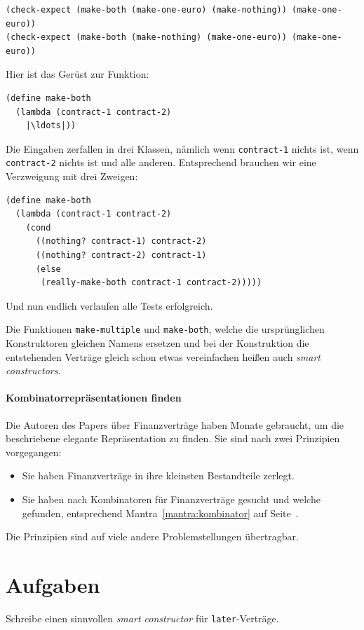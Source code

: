 %
\begin{lstlisting}
(check-expect (make-both (make-one-euro) (make-nothing)) (make-one-euro))
(check-expect (make-both (make-nothing) (make-one-euro)) (make-one-euro))
\end{lstlisting}
%
Hier ist das Gerüst zur Funktion:
%
\begin{lstlisting}
(define make-both
  (lambda (contract-1 contract-2)
    |\ldots|))
\end{lstlisting}
%
Die Eingaben zerfallen in drei Klassen, nämlich wenn
\lstinline{contract-1} nichts ist, wenn \lstinline{contract-2} nichts
ist und alle anderen.  Entsprechend brauchen wir eine Verzweigung mit
drei Zweigen:
%
\begin{lstlisting}
(define make-both
  (lambda (contract-1 contract-2)
    (cond
      ((nothing? contract-1) contract-2)
      ((nothing? contract-2) contract-1)
      (else
       (really-make-both contract-1 contract-2)))))
\end{lstlisting}
%
Und nun endlich verlaufen alle Tests erfolgreich.

Die Funktionen \lstinline{make-multiple} und \lstinline{make-both},
welche die ursprünglichen Konstruktoren gleichen Namens ersetzen und
bei der Konstruktion die entstehenden Verträge gleich schon etwas
vereinfachen heißen auch \textit{smart constructors}.

\paragraph{Kombinatorrepräsentationen finden} Die Autoren des Papers über Finanzverträge
haben Monate gebraucht, um die beschriebene elegante Repräsentation zu
finden.  Sie sind nach zwei Prinzipien vorgegangen:
%
\begin{itemize}
\item Sie haben Finanzverträge in ihre kleinsten Bestandteile zerlegt.
\item Sie haben nach Kombinatoren für Finanzverträge gesucht und
  welche gefunden, entsprechend Mantra~\ref{mantra:kombinator} auf Seite~\pageref{mantra:kombinator}.
\end{itemize}
%
Die Prinzipien sind auf viele andere Problemstellungen übertragbar.

\section*{Aufgaben}

\begin{aufgabe}
  Schreibe einen sinnvollen \textit{smart constructor} für
  \lstinline{later}-Verträge.
\end{aufgabe}

